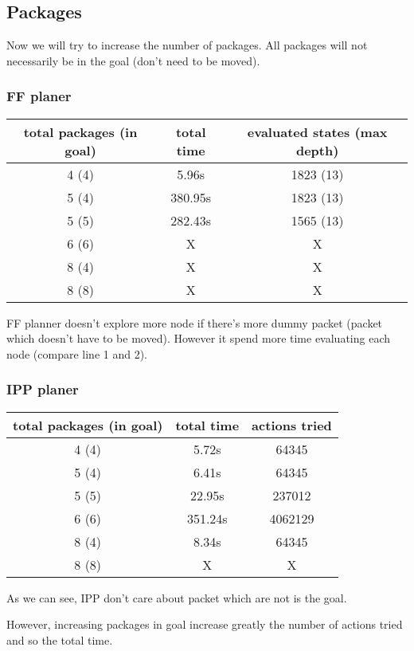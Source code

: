 \subsection{Packages}

Now we will try to increase the number of packages. All packages will not necessarily be in the goal (don't need to be moved).

  \subsubsection{FF planer}

\begin{tabular}{|c|c|c|}
  \hline
  total packages (in goal) & total time & evaluated states (max depth) \\ \hline
  4 (4)  & 5.96s & 1823 (13) \\ \hline
  5 (4)  & 380.95s & 1823 (13) \\ \hline
  5 (5)  & 282.43s & 1565 (13) \\ \hline
  6 (6)  & X & X \\ \hline
  8 (4)  & X & X \\ \hline
  8 (8)  & X & X \\ \hline
\end{tabular}

FF planner doesn't explore more node if there's more dummy packet (packet which doesn't have to be moved). However it spend more time evaluating each node (compare line 1 and 2).

  \subsubsection{IPP planer}

\begin{tabular}{|c|c|c|}
  \hline
  total packages (in goal) & total time & actions tried \\ \hline
  4 (4)  & 5.72s  & 64345 \\ \hline
  5 (4)  & 6.41s & 64345 \\ \hline
  5 (5)  & 22.95s & 237012 \\ \hline
  6 (6)  & 351.24s  & 4062129 \\ \hline
  8 (4)  & 8.34s & 64345 \\ \hline
  8 (8)  & X & X \\ \hline
\end{tabular}

As we can see, IPP don't care about packet which are not is the goal.

However, increasing packages in goal increase greatly the number of actions tried and so the total time.


